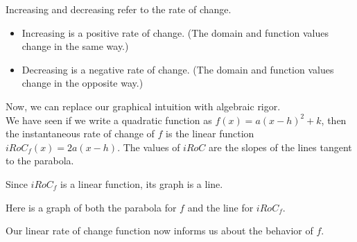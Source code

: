 \documentclass{ximera}
\begin{document}
Increasing and decreasing refer to the rate of change.


\begin{itemize}
\item Increasing is a positive rate of change. (The domain and function values change in the same way.)
\item Decreasing is a negative rate of change. (The domain and function values change in the opposite way.)
\end{itemize}



Now, we can replace our graphical intuition with algebraic rigor. \\ 

We have seen if we write a quadratic function as $f(x) = a (x - h)^2 + k$, then the instantaneous rate of change of $f$ is the linear function $iRoC_f(x) = 2 a (x - h)$. The values of $iRoC$ are the slopes of the lines tangent to the parabola.


Since $iRoC_f$ is a linear function, its graph is a line.


Here is a graph of both the parabola for $f$ and the line for $iRoC_f$.







\begin{image}
\end{image}
Our linear rate of change function now informs us about the behavior of $f$. \\
\end{document}
